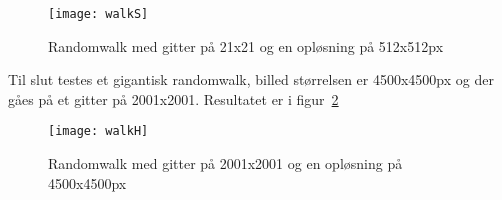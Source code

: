 \begin{figure}[h!]
	\centering
	\texttt{[image: walkS]}
		\caption{Randomwalk med gitter på 21x21 og en opløsning på 512x512px}\label{fig:walkS}
\end{figure}

Til slut testes et gigantisk randomwalk, billed størrelsen er 4500x4500px og der gåes på et gitter på 2001x2001. Resultatet er i figur~\ref{fig:walkH}

\begin{figure}[h!]
	\centering
	\texttt{[image: walkH]}
		\caption{Randomwalk med gitter på 2001x2001 og en opløsning på 4500x4500px}\label{fig:walkH}
\end{figure}
